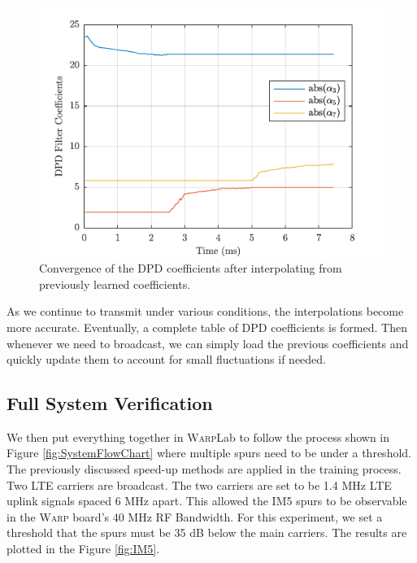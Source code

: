 \begin{figure}[t!] 
\centering
\includegraphics[]{Figures/Interpolate} 
\caption{Convergence of the DPD coefficients after interpolating from previously learned coefficients.}
\label{fig:Interpolate}
\end{figure}

 As we continue to transmit under various conditions, the interpolations become more accurate. Eventually, a complete table of DPD coefficients is formed. Then whenever we need to broadcast, we can simply load the previous coefficients and quickly update them to account for small fluctuations if needed. 
 
 \subsection{Full System Verification}
 We then put everything together in \textsc{Warp}Lab to follow the process shown in Figure \ref{fig:SystemFlowChart} where multiple spurs need to be under a threshold. The previously discussed speed-up methods are applied in the training process. Two LTE carriers are broadcast. The two carriers are set to be 1.4 MHz LTE uplink signals spaced 6 MHz apart. This allowed the IM5 spurs to be observable in the \textsc{Warp} board's 40 MHz RF Bandwidth. For this experiment, we set a threshold that the spurs must be 35 dB below the main carriers. The results are plotted in the Figure \ref{fig:IM5}.
 
